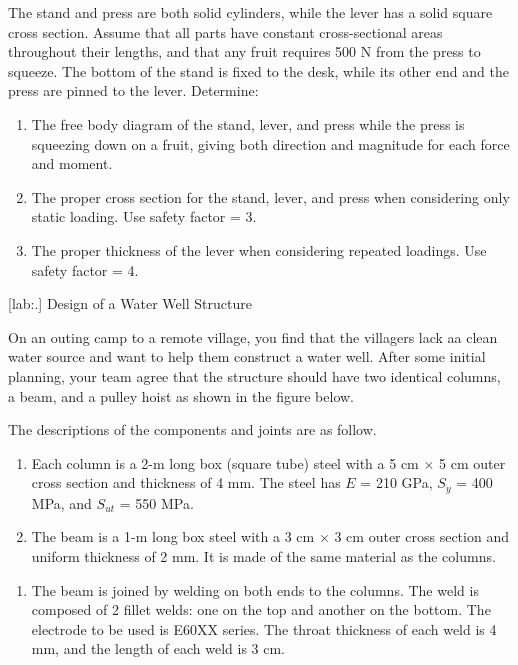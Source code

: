 \documentclass[a4paper,openany,12pt]{book}
\begin{document}
{{The stand and press are both solid cylinders, while the lever has a
solid square cross section. Assume that all parts have constant
cross-sectional areas throughout their lengths, and that any fruit
requires 500 N from the press to squeeze. The bottom of the stand is
fixed to the desk, while its other end and the press are pinned to the
lever. Determine:

\begin{enumerate}
\item The free body diagram of the stand, lever, and press while the press
is squeezing down on a fruit, giving both direction and magnitude for
each force and moment.

\item The proper cross section for the stand, lever, and press when
considering only static loading. Use safety factor = 3.

\item The proper thickness of the lever when considering repeated loadings.
Use safety factor = 4.
\end{enumerate}

[lab:.] Design of a Water Well
Structure

On an outing camp to a remote village, you find that the villagers lack
aa clean water source and want to help them construct a water well.
After some initial planning, your team agree that the structure should
have two identical columns, a beam, and a pulley hoist as shown in the
figure below.


The descriptions of the components and joints are as follow.

\begin{enumerate}
\item Each column is a 2-m long box (square tube) steel with a 5 cm
\(\times\) 5 cm outer cross section and thickness of 4 mm. The steel
has \(E\) = 210 GPa, \(S_y\) = 400 MPa, and \(S_{ut}\) = 550 MPa.

\item The beam is a 1-m long box steel with a 3 cm \(\times\) 3 cm outer
cross section and uniform thickness of 2 mm. It is made of the same
material as the columns.
\end{enumerate}


\hspace{1cm}
\begin{enumerate}
\item The beam is joined by welding on both ends to the columns. The weld
is composed of 2 fillet welds: one on the top and another on the
bottom. The electrode to be used is E60XX series. The throat
thickness of each weld is 4 mm, and the length of each weld is 3 cm.
\end{enumerate}


}}
\end{document}

